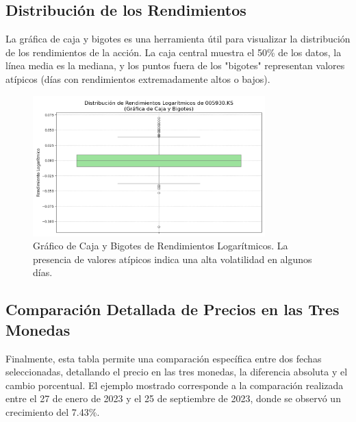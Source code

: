 \documentclass[12pt, a4paper]{article}
\begin{document}
\subsection*{Distribución de los Rendimientos}
La gráfica de caja y bigotes es una herramienta útil para visualizar la distribución de los rendimientos de la acción. La caja central muestra el 50\% de los datos, la línea media es la mediana, y los puntos fuera de los "bigotes" representan valores atípicos (días con rendimientos extremadamente altos o bajos).

\begin{figure}[H]
    \centering
    \includegraphics[width=0.8\textwidth]{grafica_caja_bigotes.png}
    \caption{Gráfico de Caja y Bigotes de Rendimientos Logarítmicos. La presencia de valores atípicos indica una alta volatilidad en algunos días.}
    \label{fig:caja_bigotes}
\end{figure}

\newpage
\subsection*{Comparación Detallada de Precios en las Tres Monedas}
Finalmente, esta tabla permite una comparación específica entre dos fechas seleccionadas, detallando el precio en las tres monedas, la diferencia absoluta y el cambio porcentual. El ejemplo mostrado corresponde a la comparación realizada entre el 27 de enero de 2023 y el 25 de septiembre de 2023, donde se observó un crecimiento del 7.43\%.
\end{document}
